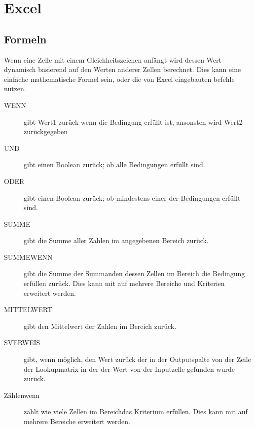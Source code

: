 \documentclass{article}
\begin{document}
\section{Excel}
\subsection{Formeln}
Wenn eine Zelle mit einem Gleichheitszeichen anfängt wird dessen Wert dynamisch basierend auf den Werten anderer Zellen berechnet. Dies kann eine einfache mathematische Formel sein, oder die von Excel eingebauten befehle nutzen.
\begin{description}
 \item[WENN]  gibt Wert1 zurück wenn die Bedingung erfüllt ist, ansonsten wird Wert2 zurückgegeben
 \item[UND]  gibt einen Boolean zurück; ob alle Bedingungen erfüllt sind.
 \item[ODER]  gibt einen Boolean zurück; ob mindestens einer der Bedingungen erfüllt sind.
 \item[SUMME]  gibt die Summe aller Zahlen im angegebenen Bereich zurück.
 \item[SUMMEWENN]  gibt die Summe der Summanden dessen Zellen im Bereich die Bedingung erfüllen zurück. Dies kann mit  auf mehrere Bereiche und Kriterien erweitert werden.
 \item[MITTELWERT]  gibt den Mittelwert der Zahlen im Bereich zurück.
 \item[SVERWEIS]  gibt, wenn möglich, den Wert zurück der in der Outputspalte von der Zeile der Lookupmatrix in der der Wert von der Inputzelle gefunden wurde zurück.
 \item[Zählenwenn]  zählt wie viele Zellen im Bereichdas Kriterium erfüllen. Dies kann mit  auf mehrere Bereiche erweitert werden.
\end{description}
\end{document}

